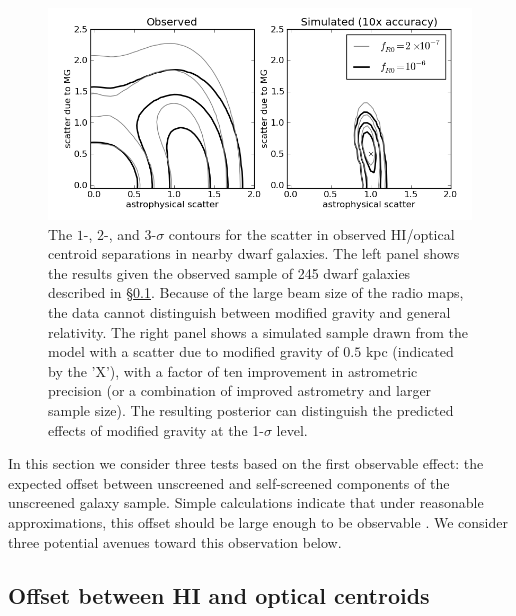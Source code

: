 \documentclass[twocolappendix, numberedappendix]{emulateapj}
\begin{document}
\begin{figure}
\centering
\includegraphics[scale=0.7]{figures/Offset_HI_optical_jake.png}
\caption{The $1$-, $2$-, and $3$-$\sigma$ contours for the scatter in observed
  HI/optical centroid separations in nearby dwarf galaxies.  The left panel
  shows the results given the observed sample of 245 dwarf galaxies described
  in \S\ref{sec:h1-opt-offset}.  Because of the large  beam size of
  the radio maps, the data cannot distinguish between modified gravity and
  general relativity.  The right panel shows a simulated sample drawn from the
  model with a scatter due to modified gravity of $0.5$ kpc (indicated by the
'X'), %
  with a factor of ten improvement in astrometric precision (or a combination of improved astrometry and larger sample size).  The resulting
  posterior can distinguish the predicted effects of modified gravity at the
  1-$\sigma$ level.}
\label{fig:offset-analysis}
\end{figure}

In this section we consider three tests based on the first observable effect:
the expected offset between unscreened and self-screened components of the
unscreened galaxy sample. Simple calculations indicate that under
reasonable approximations, this offset should be large enough to be
observable \citep{bhuvjake2011}.  We consider three potential avenues toward
this observation below.

\subsection{Offset between HI and optical centroids}
\label{sec:h1-opt-offset}
\end{document}
